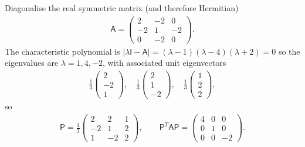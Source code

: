 \documentclass[letter-paper]{tufte-book}
\newenvironment{example}[1][Example]{\begin{trivlist}
\item[\hskip \labelsep {\bfseries #1}]}{\end{trivlist}}
\newcommand{\As}{{\mathsf{A}}}
\newcommand{\Is}{{\mathsf{I}}}
\newcommand{\Ps}{{\mathsf{P}}}
\begin{document}
\begin{example}
  Diagonalise the real symmetric matrix (and therefore Hermitian)
  \begin{align*}
    \As = \begin{pmatrix} 2 & -2 & 0 \\ -2 & 1 & -2 \\ 0 & -2 & 0 \end{pmatrix}.
  \end{align*}
  The characteristic polynomial is $|\lambda\Is - \As| = (\lambda-1)(\lambda-4)(\lambda+2) = 0$ so the eigenvalues are $\lambda=1, 4, -2$, with associated unit eigenvectors
  \begin{align*}
    \frac{1}{3}\begin{pmatrix}2 \\ -2 \\ 1 \end{pmatrix}, \quad \frac{1}{3}\begin{pmatrix}2 \\ 1 \\ -2 \end{pmatrix}, \quad \frac{1}{3}\begin{pmatrix}1 \\ 2 \\ 2 \end{pmatrix},
  \end{align*}
  so
  \begin{align*}
    \Ps = \frac{1}{3}\begin{pmatrix} 2 & 2 & 1 \\ -2 & 1 & 2 \\ 1 & -2 & 2 \end{pmatrix}, \qquad \Ps^T \As \Ps = \begin{pmatrix} 4 & 0 & 0 \\ 0 & 1 & 0 \\ 0 & 0 & -2 \end{pmatrix}.
  \end{align*}
\end{example}
\end{document}

